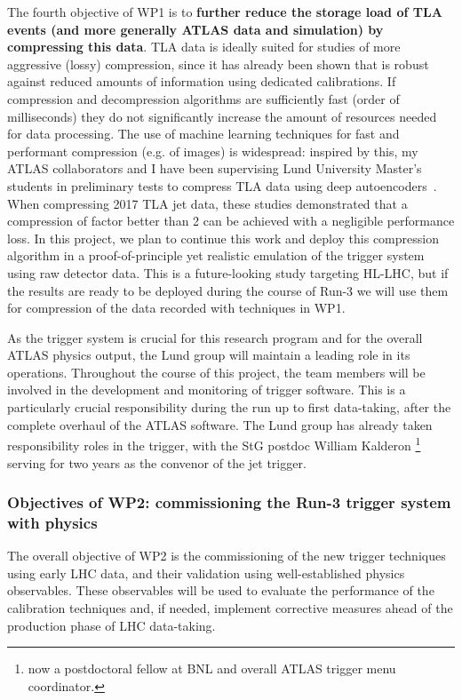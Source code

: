 The fourth objective of WP1 is to \textbf{further reduce the storage load of TLA events (and more generally ATLAS data and simulation) by compressing this data}. 
TLA data is ideally suited for studies of more aggressive (lossy) compression, since it has already been shown that is robust against reduced amounts of information using dedicated calibrations. If compression and decompression algorithms are sufficiently fast (order of milliseconds) they do not significantly increase the amount of resources needed for data processing. 
The use of machine learning techniques for fast and performant compression (e.g. of images) is widespread: inspired by this, my ATLAS collaborators and I have been supervising Lund University Master’s students in preliminary tests to compress TLA data using deep autoencoders~\cite{Vincent:2008:ECR:1390156.1390294,hinton}. %
When compressing 2017 TLA jet data, these studies demonstrated that a compression of factor better than 2 can be achieved with a negligible performance loss.  
In this project, we plan to continue this work and deploy this compression algorithm in a proof-of-principle yet realistic emulation of the trigger system using raw detector data. This is a future-looking study targeting HL-LHC, but if the results are ready to be deployed during the course of Run-3 we will use them for compression of the data recorded with techniques in WP1. 

As the trigger system is crucial for this research program and for the overall ATLAS physics output, the Lund group will maintain a leading role in its operations. 
Throughout the course of this project, the team members will be involved in the development and monitoring of trigger software. 
This is a particularly crucial responsibility during the run up to first data-taking, after the complete overhaul of the ATLAS software. 
The Lund group has already taken responsibility roles in the trigger, with the StG postdoc William Kalderon \footnote{now a postdoctoral fellow at BNL and overall ATLAS trigger menu coordinator.} serving for two years as the convenor of the jet trigger. 

\subsubsection{Objectives of WP2: commissioning the Run-3 trigger system with physics}

The overall objective of WP2 is the commissioning of the new trigger techniques using early LHC data, and their validation using well-established physics observables. 
These observables will be used to evaluate the performance of the calibration techniques and, if needed, implement corrective measures ahead of the production phase of LHC data-taking. 

